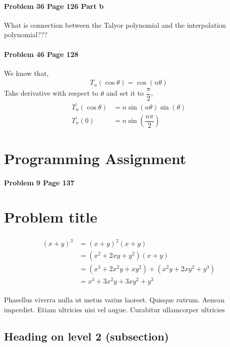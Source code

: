\documentclass[paper=a4, fontsize=11pt]{scrartcl} %
\numberwithin{equation}{section} %
\numberwithin{figure}{section} %
\numberwithin{table}{section} %
\begin{document}
\paragraph{\textbf{Problem 36 Page 126 Part b}} 
What is connection between the Talyor polynomial and the interpolation polynomial???
\newpage

\paragraph{\textbf{Problem 46 Page 128}} 
We know that,
\begin{align*}
	T_n(\cos\theta)=\cos(n\theta)
\end{align*}
Take derivative with respect to $ \theta $ and set it to $ \dfrac{\pi}{2} $,
\begin{align*}
	T_n^\prime(\cos\theta)&=n\sin(n\theta)\sin(\theta)\\
	T_n^\prime(0)&=n\sin(\dfrac{n\pi}{2})
\end{align*}




\newpage
\section*{Programming Assignment}
\paragraph{Problem 9 Page 137}

\section{Problem title}

\lipsum[2] %

\begin{align} 
\begin{split}
(x+y)^3 	&= (x+y)^2(x+y)\\
&=(x^2+2xy+y^2)(x+y)\\
&=(x^3+2x^2y+xy^2) + (x^2y+2xy^2+y^3)\\
&=x^3+3x^2y+3xy^2+y^3
\end{split}					
\end{align}

Phasellus viverra nulla ut metus varius laoreet. Quisque rutrum. Aenean imperdiet. Etiam ultricies nisi vel augue. Curabitur ullamcorper ultricies


\subsection{Heading on level 2 (subsection)}
\end{document}
